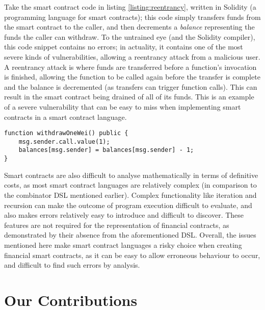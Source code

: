 Take the smart contract code in listing \ref{listing:reentrancy}, written in Solidity (a programming language for smart contracts); this code simply transfers funds from the smart contract to the caller, and then decrements a \textit{balance} representing the funds the caller can withdraw. To the untrained eye (and the Solidity compiler), this code snippet contains no errors; in actuality, it contains one of the most severe kinds of vulnerabilities, allowing a reentrancy attack from a malicious user. A reentrancy attack is where funds are transferred before a function's invocation is finished, allowing the function to be called again before the transfer is complete and the balance is decremented (as transfers can trigger function calls)\cite{eth-known-attacks}. This can result in the smart contract being drained of all of its funds. This is an example of a severe vulnerability that can be easy to miss when implementing smart contracts in a smart contract language. \\

\begin{lstlisting}[language=Solidity, caption=A Solidity function which is vulnerable to a reentrancy attack$^1$., captionpos=b, label=listing:reentrancy]
function withdrawOneWei() public {
    msg.sender.call.value(1);
    balances[msg.sender] = balances[msg.sender] - 1;
}
\end{lstlisting}

Smart contracts are also difficult to analyse mathematically in terms of definitive costs, as most smart contract languages are relatively complex (in comparison to the combinator DSL mentioned earlier). Complex functionality like iteration and recursion can make the outcome of program execution difficult to evaluate, and also makes errors relatively easy to introduce and difficult to discover. These features are not required for the representation of financial contracts, as demonstrated by their absence from the aforementioned DSL. Overall, the issues mentioned here make smart contract languages a risky choice when creating financial smart contracts, as it can be easy to allow erroneous behaviour to occur, and difficult to find such errors by analysis.

\section{Our Contributions}

